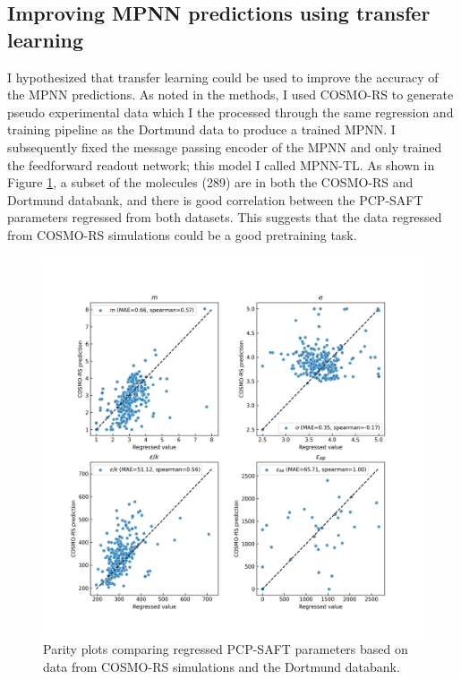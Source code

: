 \subsection{Improving MPNN predictions using transfer learning}

I hypothesized that transfer learning could be used to improve the accuracy of the MPNN predictions. As noted in the methods, I used COSMO-RS\cite{Klamt1995, Klamt2010} to generate pseudo experimental data which I the processed through the same regression and training pipeline as the Dortmund data to produce a trained MPNN. I subsequently fixed the message passing encoder of the MPNN and only trained the feedforward readout network; this model I called MPNN-TL. As shown in Figure \ref{fig:cosmo_dortmund}, a subset of the molecules (289) are in both the COSMO-RS and Dortmund databank\footnotemark, and there is good correlation between the PCP-SAFT parameters regressed from both datasets. This suggests that the data regressed from COSMO-RS simulations could be a good pretraining task. 

\begin{figure}
    \centering
    \includegraphics[width=\textwidth]{gfx/Chapter08/cosmo_dortmund_parameter_correlations.png}
    \caption{Parity plots comparing regressed PCP-SAFT parameters based on data from COSMO-RS simulations and the Dortmund databank.}
    \label{fig:cosmo_dortmund}
\end{figure}

